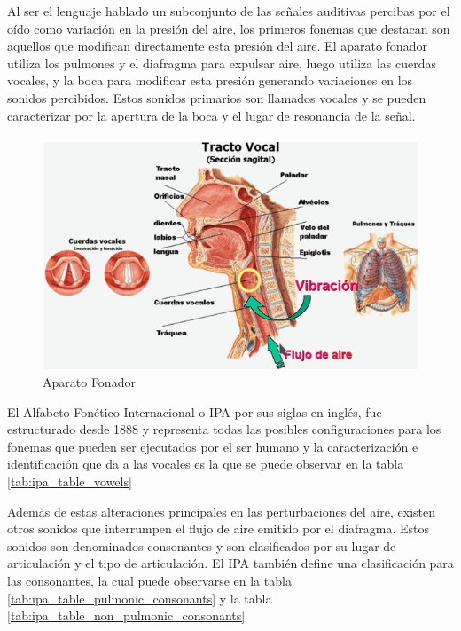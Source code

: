 Al ser el lenguaje hablado un subconjunto de las señales auditivas percibas por el oído como variación en la presión del aire, los primeros fonemas que destacan son aquellos que modifican directamente esta presión del aire. El aparato fonador utiliza los pulmones y el diafragma para expulsar aire, luego utiliza las cuerdas vocales, y la boca para modificar esta presión generando variaciones en los sonidos percibidos. Estos sonidos primarios son llamados vocales y se pueden caracterizar por la apertura de la boca y el lugar de resonancia de la señal.

\begin{figure}[H]
\caption{Aparato Fonador\cite{hableomsDeVoz}}
\label{img:aparato_fonador}
\includegraphics[width=\textwidth]{imagenes/03_02_aparato_fonador.png}
\end{figure}

El Alfabeto Fonético Internacional o IPA por sus siglas en inglés, fue estructurado desde 1888 y representa todas las posibles configuraciones para los fonemas que pueden ser ejecutados por el ser humano y la caracterización e identificación que da a las vocales es la que se puede observar en la tabla \ref{tab:ipa_table_vowels}




Además de estas alteraciones principales en las perturbaciones del aire, existen otros sonidos que interrumpen el flujo de aire emitido por el diafragma. Estos sonidos son denominados consonantes y son clasificados por su lugar de articulación y el tipo de articulación. El IPA también define una clasificación para las consonantes, la cual puede observarse en la tabla \ref{tab:ipa_table_pulmonic_consonants} y la tabla \ref{tab:ipa_table_non_pulmonic_consonants}

